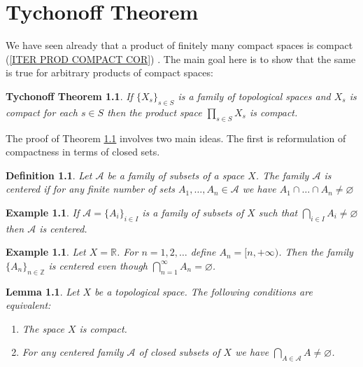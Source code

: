 \documentclass[11pt, letterpaper, oneside]{report}
\renewcommand{\chaptermark}[1]{\markboth{#1}{}}
\theoremstyle{pplain}
\newtheorem{lemma}[theorem]{Lemma}
\newtheorem{ITERMVALUE THM}[theorem]{Intermediate Value Theorem}
\newtheorem{HEINEBOREL THM}[theorem]{Heine-Borel Theorem}
\newtheorem{UMETR THM}[theorem]{Urysohn Metrization Theorem}
\newtheorem{UMETR2 THM}[theorem]{Urysohn Metrization Theorem (v.2)}
\newtheorem{TYCHONOFFTHM}[theorem]{Tychonoff Theorem}
\theoremstyle{ddefinition}
\newtheorem{definition}[theorem]{Definition}
\newtheorem{example}[theorem]{Example}
\theoremstyle{nnn}
\newtheorem{TDA NN}[theorem]{Topological Data Analysis. }
\theoremstyle{eexercise}
\newcommand{\Z}{{\mathbb Z}}
\newcommand{\R}{{\mathbb R}}
\renewcommand{\AA}{{\mathcal A}}
\newcommand{\benu}{\begin{enumerate}}
\newcommand{\eenu}{\end{enumerate}}
\begin{document}
\newpage

\chapter{Tychonoff Theorem}
\chaptermark{Tychonoff Theorem}

\thispagestyle{firststyle}



We have seen already 
that a product of finitely many compact spaces  is compact (\ref{ITER PROD COMPACT COR}) . 
The main goal here is to show that the same is true for arbitrary products of compact spaces:

\begin{TYCHONOFFTHM}
\label{TYCHONOFF THM}
If $\{X_{s}\}_{s\in S}$ is a family of topological spaces  and $X_{s}$ is compact  for  each $s\in S$ 
then the product space $\prod_{s\in S}X_{s}$ is  compact. 
\end{TYCHONOFFTHM}

The proof of Theorem \ref{TYCHONOFF THM} involves two main ideas. The first  
is  reformulation of compactness in terms of closed sets.

\begin{definition}
Let $\AA $ be a family of subsets of a space  $X$. The family $\AA$ is \emph{centered}
if for any finite number of sets $A_{1}, \dots, A_{n} \in \AA$ we have 
$A_{1}\cap \dots \cap A_{n} \neq \varnothing $
\end{definition}

\begin{example}
If $\AA = \{A_{i}\}_{i\in I}$ is a family of subsets of $X$ such that $\bigcap_{i\in I} A_{i} \neq \varnothing$
then $\AA$ is  centered. 
\end{example}

\begin{example}
Let  $X= \R$. For $n = 1, 2, \dots$ define $A_{n} = [n, +\infty)$.  Then the family $\{A_{n}\}_{n\in \Z}$ is 
centered even though $\bigcap_{n= 1}^{\infty} A_{n} = \varnothing$.   
\end{example}

\begin{lemma}
\label{COMP VIA CENTERED LEMMA}
Let $X$ be a topological space. The following conditions are equivalent:
\benu
\item The space $X$ is compact.
\item For any centered family $\AA$ of closed subsets of $X$ we have
$\bigcap_{A\in \AA} A  \neq \varnothing$. 
\eenu
\end{lemma}
\end{document}
